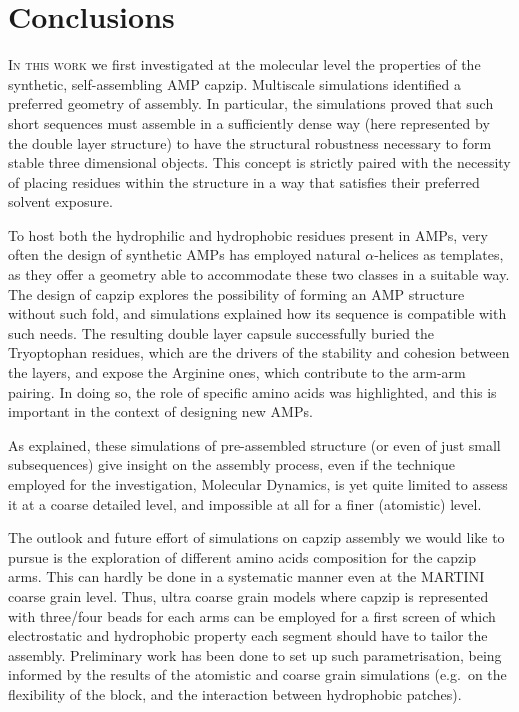\chapter{Conclusions} \label{chapter:concl}

\lettrine{I}{n this work} we first investigated at the molecular level the properties of the synthetic, self-assembling AMP capzip. Multiscale simulations identified a preferred geometry of assembly.
%
In particular, the simulations proved that such short sequences must assemble in a sufficiently dense way (here represented by the double layer structure) to have the structural robustness necessary to form stable three dimensional objects.
%
This concept is strictly paired with the necessity of placing residues within the structure in a way that satisfies their preferred solvent exposure.

To host both the hydrophilic and hydrophobic residues present in AMPs, very often the design of synthetic AMPs has employed natural $\alpha$-helices as templates, as they offer a geometry able to accommodate these two classes in a suitable way. The design of capzip explores the possibility of forming an AMP structure without such fold, and simulations explained how its sequence is compatible with such needs.
%
The resulting double layer capsule successfully buried the Tryoptophan residues, which are the drivers of the stability and cohesion between the layers, and expose the Arginine ones, which contribute to the arm-arm pairing.
%
In doing so, the role of specific amino acids was highlighted, and this is important in the context of designing new AMPs.

As explained, these simulations of pre-assembled structure (or even of just small subsequences) give insight on the assembly process, even if the technique employed for the investigation, Molecular Dynamics, is yet quite limited to assess it at a coarse detailed level, and impossible at all for a finer (atomistic) level.

The outlook and future effort of simulations on capzip assembly we would like to pursue is the exploration of different amino acids composition for the capzip arms. This can hardly be done in a systematic manner even at the MARTINI coarse grain level. Thus, ultra coarse grain models where capzip is represented with three/four beads for each arms can be employed for a first screen of which electrostatic and hydrophobic property each segment should have to tailor the assembly. Preliminary work has been done to set up such parametrisation, being informed by the results of the atomistic and coarse grain simulations (e.g.\ on the flexibility of the block, and the interaction between hydrophobic patches).

